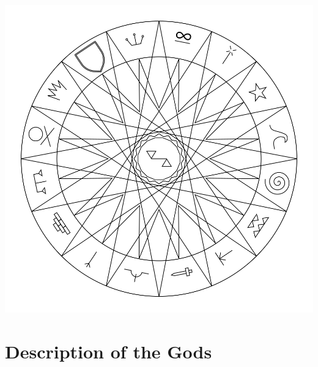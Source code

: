 \begin{center}
\includegraphics[scale=0.6]{img/weelofthegods.png}
\end{center}
\begin{twocolumn}

\end{twocolumn}
\section{Description of the Gods}
